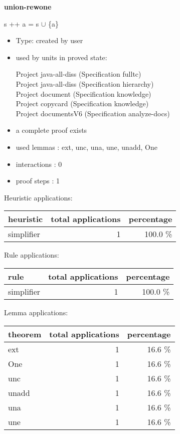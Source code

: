 \documentclass[a4paper]{article}
\begin{document}
{\LARGE\bf union-rewone}\label{lemma-union-rewone}

\medskip

 \Fol s ++ a = s $\cup$ \{a\}

\begin{itemize}

\item Type: created by user

\item used by units in proved state:

Project java-all-diss (Specification fulltc) \\
Project java-all-diss (Specification hierarchy) \\
Project document (Specification knowledge) \\
Project copycard (Specification knowledge) \\
Project documentsV6 (Specification analyze-docs)
\item       a complete proof exists
\item       used lemmas  : ext, unc, una, une, unadd, One
\item       interactions : 0
\item       proof steps  : 1
\end{itemize}

\medskip


Heuristic applications:

\begin{supertabular}{l|r|r}
heuristic	& total applications & percentage \\ \hline
simplifier & 1 & 100.0 \% \\

\end{supertabular}

Rule applications:

\begin{supertabular}{l|r|r}
rule	        & total applications & percentage \\ \hline
simplifier & 1 & 100.0 \% \\

\end{supertabular}

Lemma applications:

\begin{supertabular}{l|r|r}
theorem	        & total applications & percentage \\ \hline
ext & 1 & 16.6 \% \\
One & 1 & 16.6 \% \\
unc & 1 & 16.6 \% \\
unadd & 1 & 16.6 \% \\
una & 1 & 16.6 \% \\
une & 1 & 16.6 \% \\

\end{supertabular}
\pagebreak
\end{document}
